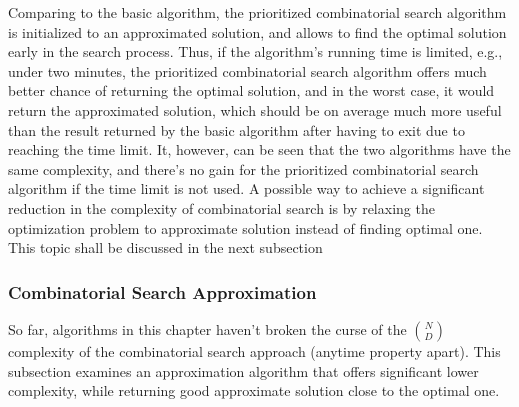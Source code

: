 Comparing to the basic algorithm, the prioritized combinatorial search
algorithm is initialized to an approximated solution, and allows to
find the optimal solution early in the search process. Thus, if the
algorithm's running time is limited, e.g., under two minutes, the
prioritized combinatorial search algorithm offers much better chance
of returning the optimal solution, and in the worst case, it would
return the approximated solution, which should be on average much more
useful than the result returned by the basic algorithm after having to
exit due to reaching the time limit. It, however, can be seen that the
two algorithms have the same complexity, and there's no gain for the
prioritized combinatorial search algorithm if the time limit is not
used. A possible way to achieve a significant reduction in the
complexity of combinatorial search is by relaxing the optimization
problem to approximate solution instead of finding optimal one. This
topic shall be discussed in the next subsection

\subsubsection{Combinatorial Search Approximation}
\label{sec:cs.greedy}

So far, algorithms in this chapter haven't broken the curse of the ${N
  \choose D}$ complexity of the combinatorial search approach (anytime
property apart). This subsection examines an approximation algorithm
that offers significant lower complexity, while returning good
approximate solution close to the optimal one.

